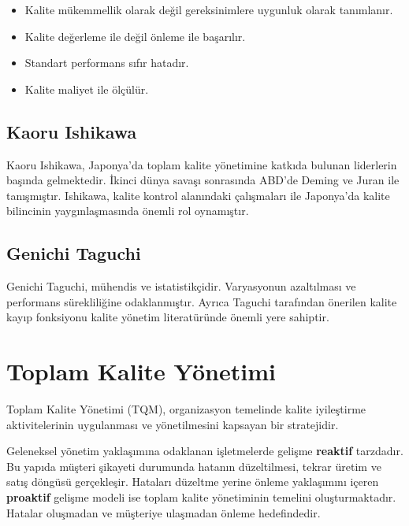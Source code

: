 \documentclass[
]{book}
\begin{document}
\begin{itemize}
\item
  Kalite mükemmellik olarak değil gereksinimlere uygunluk olarak tanımlanır.
\item
  Kalite değerleme ile değil önleme ile başarılır.
\item
  Standart performans sıfır hatadır.
\item
  Kalite maliyet ile ölçülür.
\end{itemize}

\hypertarget{kaoru-ishikawa}{%
\subsection{Kaoru Ishikawa}\label{kaoru-ishikawa}}

Kaoru Ishikawa, Japonya'da toplam kalite yönetimine katkıda bulunan liderlerin başında gelmektedir. İkinci dünya savaşı sonrasında ABD'de Deming ve Juran ile tanışmıştır. Ishikawa, kalite kontrol alanındaki çalışmaları ile Japonya'da kalite bilincinin yaygınlaşmasında önemli rol oynamıştır.

\hypertarget{genichi-taguchi}{%
\subsection{Genichi Taguchi}\label{genichi-taguchi}}

Genichi Taguchi, mühendis ve istatistikçidir. Varyasyonun azaltılması ve performans sürekliliğine odaklanmıştır. Ayrıca Taguchi tarafından önerilen kalite kayıp fonksiyonu kalite yönetim literatüründe önemli yere sahiptir.

\hypertarget{toplam-kalite-yuxf6netimi}{%
\section{Toplam Kalite Yönetimi}\label{toplam-kalite-yuxf6netimi}}

Toplam Kalite Yönetimi (TQM), organizasyon temelinde kalite iyileştirme aktivitelerinin uygulanması ve yönetilmesini kapsayan bir stratejidir.

Geleneksel yönetim yaklaşımına odaklanan işletmelerde gelişme \textbf{reaktif} tarzdadır. Bu yapıda müşteri şikayeti durumunda hatanın düzeltilmesi, tekrar üretim ve satış döngüsü gerçekleşir. Hataları düzeltme yerine önleme yaklaşımını içeren \textbf{proaktif} gelişme modeli ise toplam kalite yönetiminin temelini oluşturmaktadır. Hatalar oluşmadan ve müşteriye ulaşmadan önleme hedefindedir.
\end{document}
